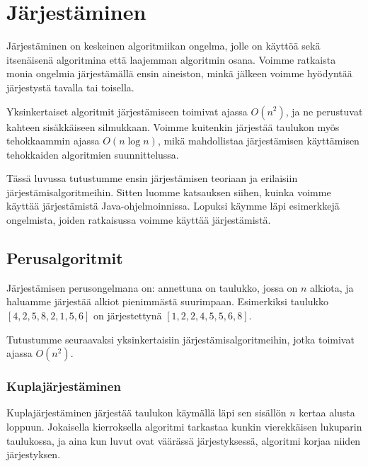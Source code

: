 \chapter{Järjestäminen}

Järjestäminen on keskeinen algoritmiikan ongelma,
jolle on käyttöä sekä itsenäisenä algoritmina että
laajemman algoritmin osana.
Voimme ratkaista monia ongelmia järjestämällä
ensin aineiston, minkä jälkeen voimme hyö\-dyntää
järjestystä tavalla tai toisella.

Yksinkertaiset algoritmit järjestämiseen toimivat
ajassa $O(n^2)$, ja ne perustuvat kahteen sisäkkäiseen
silmukkaan.
Voimme kuitenkin järjestää taulukon myös tehokkaammin
ajassa $O(n \log n)$, mikä mahdollistaa järjestämisen
käyttämisen tehokkaiden algoritmien suunnittelussa.

Tässä luvussa tutustumme ensin järjestämisen teoriaan
ja erilaisiin järjes\-tämisalgoritmeihin.
Sitten luomme katsauksen siihen, kuinka voimme
käyttää järjestämistä Java-ohjelmoinnissa.
Lopuksi käymme läpi esimerkkejä ongelmista,
joiden ratkaisussa voimme käyttää järjestämistä.

\section{Perusalgoritmit}

Järjestämisen perusongelmana on:
annettuna on taulukko, jossa on $n$ alkiota,
ja haluamme järjestää alkiot pienimmästä suurimpaan.
Esimerkiksi taulukko $[4,2,5,8,2,1,5,6]$ on
järjestettynä $[1,2,2,4,5,5,6,8]$.

Tutustumme seuraavaksi yksinkertaisiin järjestämisalgoritmeihin,
jotka toimivat ajassa $O(n^2)$.

\subsection{Kuplajärjestäminen}

Kuplajärjestäminen järjestää taulukon käymällä läpi sen
sisällön $n$ kertaa alusta loppuun.
Jokaisella kierroksella algoritmi tarkastaa kunkin
vierekkäisen lukuparin taulukossa, ja aina kun luvut ovat väärässä
järjestyksessä, algoritmi korjaa niiden järjestyksen.

